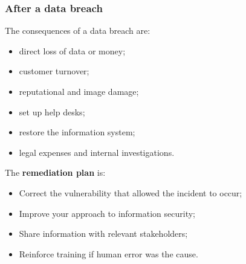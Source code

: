 \subsubsection{After a data breach}
The consequences of a data breach are:
\begin{itemize}
    \item direct loss of data or money;
    \item customer turnover;
    \item reputational and image damage;
    \item set up help desks;
    \item restore the information system;
    \item legal expenses and internal investigations.
\end{itemize}
The \textbf{remediation plan} is:
\begin{itemize}
    \item Correct the vulnerability that allowed the incident to occur;
    \item Improve your approach to information security;
    \item Share information with relevant stakeholders;
    \item Reinforce training if human error was the cause.
\end{itemize}